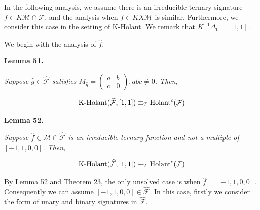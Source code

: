 \documentclass[10pt,a4paper]{article}
\begin{document}
In the following analysis, we assume there is an irreducible ternary signature $f\in K\mathcal{M}\cap\mathcal{F}$, and the analysis when $f\in KX\mathcal{M}$ is similar. Furthermore, we consider this case in the setting of K-Holant. We remark that $K^{-1}\Delta_{0}=[1,1]$.\par




We begin with the analysis of $\widehat{f}$.\par





\par\medskip\noindent\textbf{
\textbf{Lemma 51}\textbf{.}
}\par



\emph{Suppose $\widehat{g}\in\widehat{\mathcal{F}}$ satisfies $M_{\widehat{g}}=\begin{pmatrix}a&b\\
c&0\end{pmatrix},abc\neq 0$. Then,}\par


\[\begin{gathered}
\textup{{K-Holant}}(\widehat{\mathcal{F}},[1,1])\equiv_{T}\textup{{Holant}}^{c}(\mathcal{F})
\end{gathered}\]







\par\medskip\noindent\textbf{
\textbf{Lemma 52}\textbf{.}
}\par



\emph{Suppose $\widehat{f}\in\mathcal{M}\cap\widehat{\mathcal{F}}$ is an irreducible ternary function and not a multiple of $[-1,1,0,0]$. Then,}\par


\[\begin{gathered}
\textup{{K-Holant}}(\widehat{\mathcal{F}},[1,1])\equiv_{T}\textup{{Holant}}^{c}(\mathcal{F})
\end{gathered}\]






By Lemma 52 and Theorem 23, the only unsolved case is when $\widehat{f}=[-1,1,0,0]$. Consequently we can assume $[-1,1,0,0]\in\widehat{\mathcal{F}}$. In this case, firstly we consider the form of unary and binary signatures in $\widehat{\mathcal{F}}$.\par
\end{document}
